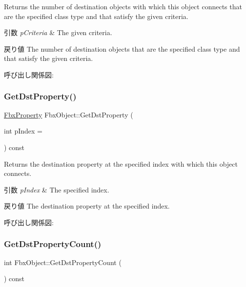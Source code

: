 Returns the number of destination objects with which this object connects that are the specified class type and that satisfy the given criteria. 
\begin{DoxyParams}{引数}
{\em p\+Criteria} & The given criteria. \\
\hline
\end{DoxyParams}
\begin{DoxyReturn}{戻り値}
The number of destination objects that are the specified class type and that satisfy the given criteria. 
\end{DoxyReturn}
呼び出し関係図\+:
\mbox{\label{class_fbx_object_aaec1374d8a9a02429ae4eb317438856d}} 
\subsubsection{\texorpdfstring{Get\+Dst\+Property()}{GetDstProperty()}}
{\footnotesize\ttfamily \hyperlink{class_fbx_property}{Fbx\+Property} Fbx\+Object\+::\+Get\+Dst\+Property (\begin{DoxyParamCaption}\item[{int}]{p\+Index = {} }\end{DoxyParamCaption}) const}

Returns the destination property at the specified index with which this object connects. 
\begin{DoxyParams}{引数}
{\em p\+Index} & The specified index. \\
\hline
\end{DoxyParams}
\begin{DoxyReturn}{戻り値}
The destination property at the specified index. 
\end{DoxyReturn}
呼び出し関係図\+:
\mbox{\label{class_fbx_object_a878feb5a29caf3262360037fe4a5c1e6}} 
\subsubsection{\texorpdfstring{Get\+Dst\+Property\+Count()}{GetDstPropertyCount()}}
{\footnotesize\ttfamily int Fbx\+Object\+::\+Get\+Dst\+Property\+Count (\begin{DoxyParamCaption}{ }\end{DoxyParamCaption}) const}

